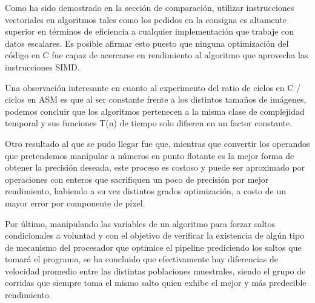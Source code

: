 \par Como ha sido demostrado en la sección de comparación, utilizar instrucciones vectoriales en algoritmos tales como los pedidos en la consigna 
es altamente superior en términos de eficiencia a cualquier implementación que trabaje con datos escalares. Es posible afirmar esto puesto que ninguna optimización del código en C
fue capaz de acercarse en rendimiento al algoritmo que aprovecha las instrucciones SIMD.
\par Una observación interesante en cuanto al experimento del ratio de ciclos en C / ciclos en ASM es que al ser constante frente a los distintos tamaños de imágenes, 
podemos concluir que los algoritmos pertenecen a la misma clase de complejidad temporal y sus funciones T(n) de tiempo solo difieren en un factor constante.
\par Otro resultado al que se pudo llegar fue que, mientras que convertir los operandos que pretendemos manipular a números en punto flotante es la mejor forma de obtener la 
precisión deseada, este proceso es costoso y puede ser aproximado por operaciones con enteros que sacrifiquen un poco de precisión por mejor rendimiento, habiendo a su vez distintos 
grados optimización, a costo de un mayor error por componente de píxel.
\par Por último, manipulando las variables de un algoritmo para forzar saltos condicionales a voluntad y con el objetivo de verificar la existencia de algún tipo de mecanismo
del procesador que optimice el pipeline prediciendo los saltos que tomará el programa, se ha concluido que efectivamente hay diferencias de velocidad promedio entre las distintas 
poblaciones muestrales, siendo el grupo de corridas que siempre toma el mismo salto quien exhibe el mejor y más predecible rendimiento.